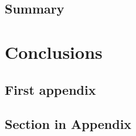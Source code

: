 \documentclass[times,thesis]{uom_thesis_casson} %
\begin{document}
  \section{Summary}
  \lipsum[6]
 



\chapter{Conclusions}



\printbibliography[title={References},heading=bibintoc] %



\begin{uomappendix} 
  \chapter{First appendix}
    \section{Section in Appendix}
    \lipsum[1-6]
\end{uomappendix}


\end{document}
